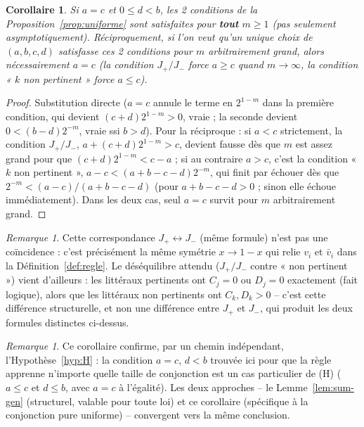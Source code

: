 \documentclass[12pt,a4paper]{article}
\newtheorem{corollary}[theorem]{Corollaire}
\theoremstyle{remark}
\newtheorem{remark}[theorem]{Remarque}
\newcommand{\vbar}{\bar{v}}
\begin{document}
\begin{corollary}\label{cor:pour-tout-m}
Si $a=c$ et $0\le d<b$, les 2 conditions de la Proposition~\ref{prop:uniforme}
sont satisfaites pour \textbf{tout} $m\ge1$ (pas seulement asymptotiquement).
Réciproquement, si l'on veut qu'un unique choix de $(a,b,c,d)$ satisfasse ces
2 conditions pour $m$ arbitrairement grand, alors nécessairement $a=c$ (la
condition $J_+/J_-$ force $a\ge c$ quand $m\to\infty$, la condition « $k$ non
pertinent » force $a\le c$).
\end{corollary}

\begin{proof}
Substitution directe ($a=c$ annule le terme en $2^{1-m}$ dans la première
condition, qui devient $(c+d)2^{1-m}>0$, vraie ; la seconde devient
$0<(b-d)2^{-m}$, vraie ssi $b>d$). Pour la réciproque : si $a<c$ strictement,
la condition $J_+/J_-$, $a+(c+d)2^{1-m}>c$, devient fausse dès que $m$ est
assez grand pour que $(c+d)2^{1-m}<c-a$ ; si au contraire $a>c$, c'est la
condition « $k$ non pertinent », $a-c<(a+b-c-d)2^{-m}$, qui finit par échouer
dès que $2^{-m}<(a-c)/(a+b-c-d)$ (pour $a+b-c-d>0$ ; sinon elle échoue
immédiatement). Dans les deux cas, seul $a=c$ survit pour $m$ arbitrairement
grand.
\end{proof}

\begin{remark}
Cette correspondance $J_+\leftrightarrow J_-$ (même formule) n'est pas une
coïncidence : c'est précisément la même symétrie $x\to1-x$ qui relie $v_i$ et
$\vbar_i$ dans la Définition~\ref{def:regle}. Le déséquilibre attendu
($J_+/J_-$ contre « non pertinent ») vient d'ailleurs : les littéraux
pertinents ont $C_j=0$ ou $D_j=0$ exactement (fait logique), alors que les
littéraux non pertinents ont $C_k,D_k>0$ -- c'est cette différence structurelle,
et non une différence entre $J_+$ et $J_-$, qui produit les deux formules
distinctes ci-dessus.
\end{remark}

\begin{remark}
Ce corollaire confirme, par un chemin indépendant, l'Hypothèse~\ref{hyp:H} :
la condition $a=c,\,d<b$ trouvée ici pour que la règle apprenne
n'importe quelle taille de conjonction est un cas particulier de (H)
($a\le c$ et $d\le b$, avec $a=c$ à l'égalité). Les deux approches -- le
Lemme~\ref{lem:sum-gen} (structurel, valable pour toute loi) et ce corollaire
(spécifique à la conjonction pure uniforme) -- convergent vers la même
conclusion.
\end{remark}
\end{document}
